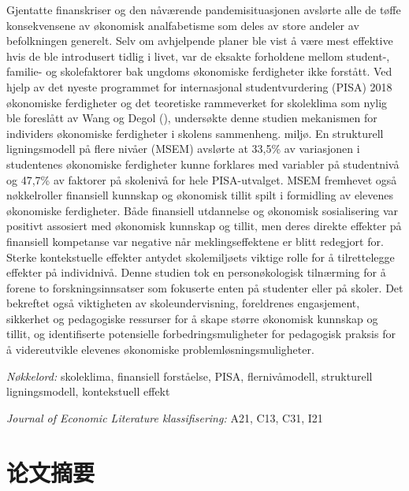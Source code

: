 \documentclass[a4paper,11pt,UKenglish,twoside,openright]{report}\usepackage[]{graphicx}\usepackage[]{color}
\begin{document}
\noindent Gjentatte finanskriser og den nåværende pandemisituasjonen avslørte alle de tøffe konsekvensene av økonomisk analfabetisme som deles av store andeler av befolkningen generelt. Selv om avhjelpende planer ble vist å være mest effektive hvis de ble introdusert tidlig i livet, var de eksakte forholdene mellom student-, familie- og skolefaktorer bak ungdoms økonomiske ferdigheter ikke forstått. Ved hjelp av det nyeste programmet for internasjonal studentvurdering (PISA) 2018 økonomiske ferdigheter og det teoretiske rammeverket for skoleklima som nylig ble foreslått av Wang og Degol (\citeyear{wang:2016}), undersøkte denne studien mekanismen for individers økonomiske ferdigheter i skolens sammenheng. miljø. En strukturell ligningsmodell på flere nivåer (MSEM) avslørte at 33,5\% av variasjonen i studentenes økonomiske ferdigheter kunne forklares med variabler på studentnivå og 47,7\% av faktorer på skolenivå for hele PISA-utvalget. MSEM fremhevet også nøkkelroller finansiell kunnskap og økonomisk tillit spilt i formidling av elevenes økonomiske ferdigheter. Både finansiell utdannelse og økonomisk sosialisering var positivt assosiert med økonomisk kunnskap og tillit, men deres direkte effekter på finansiell kompetanse var negative når meklingseffektene er blitt redegjort for. Sterke kontekstuelle effekter antydet skolemiljøets viktige rolle for å tilrettelegge effekter på individnivå. Denne studien tok en personøkologisk tilnærming for å forene to forskningsinnsatser som fokuserte enten på studenter eller på skoler. Det bekreftet også viktigheten av skoleundervisning, foreldrenes engasjement, sikkerhet og pedagogiske ressurser for å skape større økonomisk kunnskap og tillit, og identifiserte potensielle forbedringsmuligheter for pedagogisk praksis for å videreutvikle elevenes økonomiske problemløsningsmuligheter.

\textit{Nøkkelord:} skoleklima, finansiell forståelse, PISA, flernivåmodell, strukturell ligningsmodell, kontekstuell effekt

\textit{Journal of Economic Literature klassifisering:} A21, C13, C31, I21
\setcounter{page}{9}


\chapter*{论文摘要}
\label{Ab.3}
\end{document}
